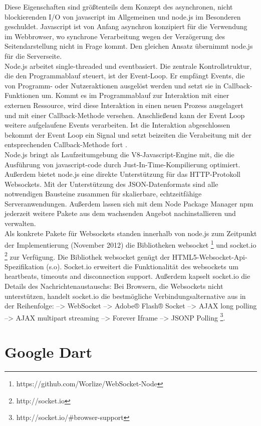 Diese Eigenschaften sind größtenteils dem Konzept des asynchronen, nicht blockierenden I/O von javascript im Allgemeinen und node.js im Besonderen geschuldet.
Javascript ist von Anfang asynchron konzipiert für die Verwendung im Webbrowser, wo synchrone Verarbeitung wegen der Verzögerung des Seitendarstellung nicht in Frage kommt. Den gleichen Ansatz übernimmt node.js für die Serverseite.
\\
Node.js arbeitet single-threaded und eventbasiert. Die zentrale Kontrollstruktur, die den Programmablauf steuert, ist der Event-Loop. Er empfängt Events, die von Programm- oder Nutzeraktionen ausgelöst werden und setzt sie in Callback-Funktionen um.
Kommt es im Programmablauf zur Interaktion mit einer externen Ressource, wird diese Interaktion in einen neuen Prozess ausgelagert und mit einer Callback-Methode versehen. Anschließend kann der Event Loop weitere aufgelaufene Events verarbeiten. Ist die Interaktion abgeschlossen bekommt der Event Loop ein Signal und setzt beizeiten die Verabeitung mit der entsprechenden Callback-Methode  fort \cite{teixeira}.\\
Node.js bringt als Laufzeitumgebung die V8-Javascript-Engine mit, die die Ausführung von javascript-code durch Just-In-Time-Kompilierung optimiert. Außerdem bietet node.js eine direkte Unterstützung für das HTTP-Protokoll Websockets. Mit der Unterstützung des JSON-Datenformats sind alle notwendigen Bausteine zusammen für skalierbare, echtzeitfähige Serveranwendungen.
Außerdem lassen sich mit dem Node Package Manager npm jederzeit weitere Pakete aus dem wachsenden Angebot nachinstallieren und verwalten.\\
Als konkrete Pakete für Websockets standen innerhalb von node.js zum Zeitpunkt der Implementierung (November 2012) die Bibliotheken websocket \footnote{https://github.com/Worlize/WebSocket-Node} und socket.io \footnote{http://socket.io} zur Verfügung. Die Bibliothek websocket genügt der HTML5-Websocket-Api-Spezifikation (s.o). Socket.io erweitert die Funktionalität des websockets um heartbeats, timeouts and disconnection support. Außerdem kapselt socket.io die Details des Nachrichtenaustauschs: Bei Browsern, die Websockets nicht unterstützen, handelt socket.io die bestmögliche Verbindungsalternative aus in der Reihenfolge: 
-->    WebSocket 
 -->   Adobe® Flash® Socket
  -->  AJAX long polling
   --> AJAX multipart streaming
 -->   Forever Iframe
 -->   JSONP Polling
\footnote{http://socket.io/\#browser-support}.

\section{Google Dart}\label{s.Google Dart }

